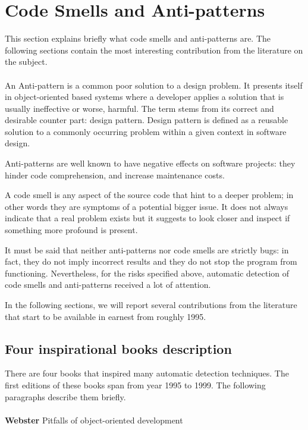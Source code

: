 \section{Code Smells and Anti-patterns}
This section explains briefly what code smells and anti-patterns are. The following sections contain the most interesting contribution from the literature on the subject.
\\
\\
An Anti-pattern is a common poor solution to a design problem. It presents itself in object-oriented based systems where a developer applies a solution that is usually ineffective or worse, harmful.
The term stems from its correct and desirable counter part: design pattern.
Design pattern is defined as a reusable solution to a commonly occurring problem within a given context in software design.

Anti-patterns are well known to have negative effects on software projects: they hinder code comprehension, and increase maintenance costs.

A code smell is any aspect of the source code that hint to a deeper problem; in other words they are symptoms of a potential bigger issue. It does not always indicate that a real problem exists but it suggests to look closer and inspect if something more profound is present.

It must be said that neither anti-patterns nor code smells are strictly bugs: in fact, they do not imply incorrect results and they do not stop the program from functioning. Nevertheless, for the risks specified above, automatic detection of code smells and anti-patterns received a lot of attention. 

In the following sections, we will report several contributions from the literature that start to be available in earnest from roughly 1995.


\subsection{Four inspirational books description}

There are four books that inspired many automatic detection techniques. The first editions of these books span from year 1995 to 1999. 
The following paragraphs describe them briefly.
\\
\\
\textbf{Webster} \cite{webster1995pitfalls} Pitfalls of object-oriented development

